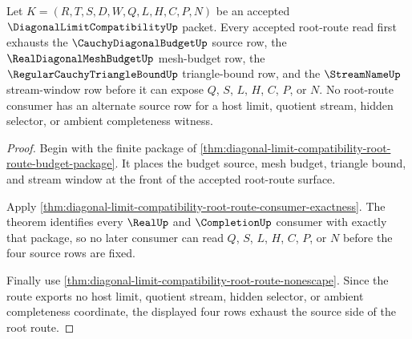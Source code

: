 \begin{theorem}
\label{thm:diagonal-limit-compatibility-root-route-source-exhaustion}
Let $K=(R,T,S,D,W,Q,L,H,C,P,N)$ be an accepted $\DiagonalLimitCompatibilityUp$ packet. Every accepted root-route read first exhausts the $\CauchyDiagonalBudgetUp$ source row, the $\RealDiagonalMeshBudgetUp$ mesh-budget row, the $\RegularCauchyTriangleBoundUp$ triangle-bound row, and the $\StreamNameUp$ stream-window row before it can expose $Q$, $S$, $L$, $H$, $C$, $P$, or $N$. No root-route consumer has an alternate source row for a host limit, quotient stream, hidden selector, or ambient completeness witness.
\end{theorem}
\begin{proof}
Begin with the finite package of \autoref{thm:diagonal-limit-compatibility-root-route-budget-package}. It places the budget source, mesh budget, triangle bound, and stream window at the front of the accepted root-route surface.

Apply \autoref{thm:diagonal-limit-compatibility-root-route-consumer-exactness}. The theorem identifies every $\RealUp$ and $\CompletionUp$ consumer with exactly that package, so no later consumer can read $Q$, $S$, $L$, $H$, $C$, $P$, or $N$ before the four source rows are fixed.

Finally use \autoref{thm:diagonal-limit-compatibility-root-route-nonescape}. Since the route exports no host limit, quotient stream, hidden selector, or ambient completeness coordinate, the displayed four rows exhaust the source side of the root route.
\end{proof}

